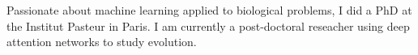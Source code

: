 \ifextended%
  Passionate about machine learning applied to biological problems, I did a PhD at the Institut Pasteur in Paris.
  I am currently a post-doctoral reseacher using deep attention networks to study evolution. 
\fi
